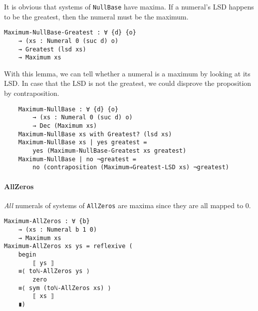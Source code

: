 \documentclass[\main/thesis.tex]{subfiles}
\begin{document}
It is obvious that systems of {\lstinline|NullBase|} have maxima.
If a numeral's LSD happens to be the greatest,
then the numeral must be the maximum.

\begin{lstlisting}
Maximum-NullBase-Greatest : ∀ {d} {o}
    → (xs : Numeral 0 (suc d) o)
    → Greatest (lsd xs)
    → Maximum xs
\end{lstlisting}

With this lemma, we can tell whether a numeral is a maximum by looking at its
LSD. In case that the LSD is not the greatest, we could disprove the proposition
by contraposition.

\begin{lstlisting}
    Maximum-NullBase : ∀ {d} {o}
        → (xs : Numeral 0 (suc d) o)
        → Dec (Maximum xs)
    Maximum-NullBase xs with Greatest? (lsd xs)
    Maximum-NullBase xs | yes greatest =
        yes (Maximum-NullBase-Greatest xs greatest)
    Maximum-NullBase | no ¬greatest =
        no (contraposition (Maximum⇒Greatest-LSD xs) ¬greatest)
\end{lstlisting}

\paragraph{AllZeros}

\begin{center}
    \begin{adjustbox}{max width=\textwidth}
    \end{adjustbox}
\end{center}

\textit{All} numerals of systems of {\lstinline|AllZeros|} are maxima since they
are all mapped to $ 0 $.

\begin{lstlisting}
Maximum-AllZeros : ∀ {b}
    → (xs : Numeral b 1 0)
    → Maximum xs
Maximum-AllZeros xs ys = reflexive (
    begin
        ⟦ ys ⟧
    ≡⟨ toℕ-AllZeros ys ⟩
        zero
    ≡⟨ sym (toℕ-AllZeros xs) ⟩
        ⟦ xs ⟧
    ∎)
\end{lstlisting}
\end{document}
